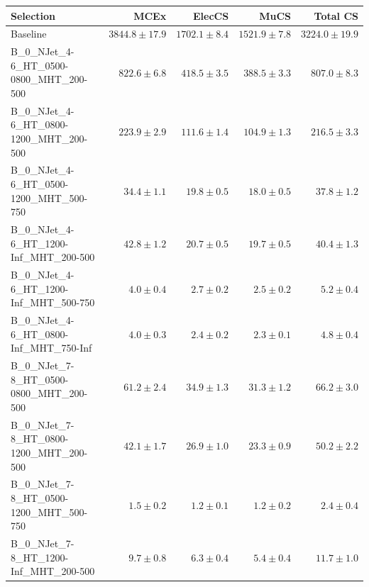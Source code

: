 \documentclass{beamer}
\begin{document}
\begin{frame}
\tiny
\begin{tabular}{lrrrr}
\toprule

                                                Selection  &          MCEx  &         ElecCS  &                     MuCS  &          Total CS  \\
\midrule
                                         Baseline &           $3844.8\pm17.9$&           $1702.1\pm8.4$&           $1521.9\pm7.8$&               $3224.0\pm19.9$ \\
     B\_0\_NJet\_4-6\_HT\_0500-0800\_MHT\_200-500 &             $822.6\pm6.8$&            $418.5\pm3.5$&            $388.5\pm3.3$&                 $807.0\pm8.3$ \\
     B\_0\_NJet\_4-6\_HT\_0800-1200\_MHT\_200-500 &             $223.9\pm2.9$&            $111.6\pm1.4$&            $104.9\pm1.3$&                 $216.5\pm3.3$ \\
     B\_0\_NJet\_4-6\_HT\_0500-1200\_MHT\_500-750 &              $34.4\pm1.1$&             $19.8\pm0.5$&             $18.0\pm0.5$&                  $37.8\pm1.2$ \\
      B\_0\_NJet\_4-6\_HT\_1200-Inf\_MHT\_200-500 &              $42.8\pm1.2$&             $20.7\pm0.5$&             $19.7\pm0.5$&                  $40.4\pm1.3$ \\
      B\_0\_NJet\_4-6\_HT\_1200-Inf\_MHT\_500-750 &               $4.0\pm0.4$&              $2.7\pm0.2$&              $2.5\pm0.2$&                   $5.2\pm0.4$ \\
      B\_0\_NJet\_4-6\_HT\_0800-Inf\_MHT\_750-Inf &               $4.0\pm0.3$&              $2.4\pm0.2$&              $2.3\pm0.1$&                   $4.8\pm0.4$ \\
     B\_0\_NJet\_7-8\_HT\_0500-0800\_MHT\_200-500 &              $61.2\pm2.4$&             $34.9\pm1.3$&             $31.3\pm1.2$&                  $66.2\pm3.0$ \\
     B\_0\_NJet\_7-8\_HT\_0800-1200\_MHT\_200-500 &              $42.1\pm1.7$&             $26.9\pm1.0$&             $23.3\pm0.9$&                  $50.2\pm2.2$ \\
     B\_0\_NJet\_7-8\_HT\_0500-1200\_MHT\_500-750 &               $1.5\pm0.2$&              $1.2\pm0.1$&              $1.2\pm0.2$&                   $2.4\pm0.4$ \\
      B\_0\_NJet\_7-8\_HT\_1200-Inf\_MHT\_200-500 &               $9.7\pm0.8$&              $6.3\pm0.4$&              $5.4\pm0.4$&                  $11.7\pm1.0$ \\

\end{tabular}
\end{frame}
\end{document}
